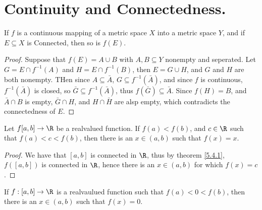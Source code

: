 
\section{Continuity and Connectedness.}

\begin{theorem}\label{5.4.1}
    If $f$ is a continuous mapping of a metric space  $X$ into a metric space  $Y$, and 
    if  $E \subseteq X$ is Connected, then so is  $f(E)$.
\end{theorem}
\begin{proof}
    Suppose that $f(E)=A \cup B$ with  $A,B \subseteq Y$ nonempty and seperated. Let 
    $G=E \cap f^{-1}(A)$ and  $H=E \cap f^{-1}(B)$, then  $E=G \cup H$, and  $G$ and  $H$ are both 
    nonempty. THen since  $A \subseteq \bar{A}$,  $G \subseteq f^{-1}(\bar{A})$, and since  $f$ is continuous, 
    $f^{-1}(\bar{A})$ is closed, so  $\bar{G} \subseteq f^{-1}(\bar{A})$, thus  $f(\bar{G}) \subseteq \bar{A}$. 
    Since  $f(H)=B$, and  $\bar{A} \cap B$ is empty,  $\bar{G} \cap H$, and $H \cap \bar{H}$ are 
    alsp empty, which contradicts the connectedness of $E$.
\end{proof}

\begin{theorem}\label{5.4.2}
    Let $f[a,b] \rightarrow \R$ be a realvalued function. If  $f(a)<f(b)$, and  $c \in \R$ such that 
    $f(a)<c<f(b)$, then there is an  $x \in (a,b)$ such that $f(x)=x$.
\end{theorem}
\begin{proof}
    We have that $[a,b]$ is connected in  $\R$, thus by theorem \ref{5.4.1}, $f([a,b])$ is 
    connected in $\R$, hence there is an  $x \in  (a,b)$ for which $f(x)=c$.
\end{proof}

\begin{corollary}
    If $f:[a,b] \rightarrow \R$ is a realvaulued function such that $f(a)<0<f(b)$, then 
    there is an $x \in (a,b)$ such that $f(x)=0$.
\end{corollary}
